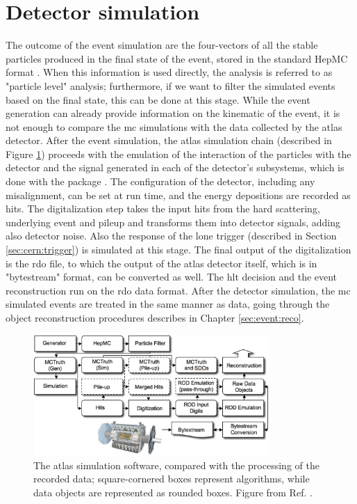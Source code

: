 \section{Detector simulation}
\label{sec:detsim}

The outcome of the event simulation are the four-vectors of all the stable particles produced in the final state of the event, stored in the standard HepMC format \cite{Dobbs:2001ck}.
When this information is used directly, the analysis is referred to as "particle level" analysis; furthermore, if we want to filter the simulated events based on the final state, this can be done at this stage. 
While the event generation can already provide information on the kinematic of the event, it is not enough to compare the \gls{mc} simulations with the 
data collected by the \gls{atlas} detector. 
After the event simulation, the \gls{atlas} simulation chain \cite{Aad:2010ah} (described in Figure \ref{fig:sim:chain}) proceeds with the emulation of the
interaction of the particles with the detector and the signal generated in each of the detector's subsystems, 
which is done with the \geant package \cite{Agostinelli:2002hh}. The configuration of the detector, including any misalignment, can be set at run time, and the energy depositions are recorded as hits. The digitalization step takes the input hits from the hard scattering, underlying event and pileup and transforms them into detector signals, adding also detector noise. Also the response of the \gls{lone} trigger (described in Section \ref{sec:cern:trigger}) is simulated at this stage. The final output of the digitalization is the \gls{rdo} file, to which the output of the \gls{atlas} detector itself, which is in "bytestream" format, can be converted as well. The \gls{hlt} decision and the event reconstruction run on the \gls{rdo} data format. After the detector simulation, the \gls{mc} simulated events are treated in the same manner as data, going through the object reconstruction procedures
describes in Chapter \ref{sec:event:reco}.

\begin{figure}[h]
\begin{center}
    \includegraphics[width=0.8\textwidth]{figures/simul/outline_v2}
\end{center}
\caption{The \gls{atlas} simulation software, compared with the processing of the recorded data; square-cornered boxes represent algorithms, while data objects are represented as rounded boxes. Figure from Ref. \cite{Aad:2010ah}.}
 \label{fig:sim:chain}
\end{figure}

